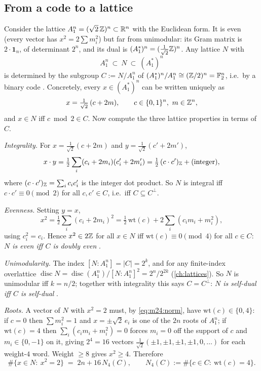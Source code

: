 \subsection*{From a code to a lattice}
Consider the lattice $A_1^n=(\sqrt2\,\mathbb{Z})^n\subset\mathbb{R}^n$ with the Euclidean form. It is even
(every vector has $x^2=2\sum m_i^2$) but far from unimodular: its Gram matrix is $2\cdot\mathbf1_n$,
of determinant $2^n$, and its dual is $(A_1^*)^n=(\tfrac1{\sqrt2}\mathbb{Z})^n$. Any lattice $N$ with
\begin{equation}\label{eq:m24:sandwich}
 A_1^n\ \subset\ N\ \subset\ (A_1^*)^n
\end{equation}
is determined by the subgroup $C:=N/A_1^n$ of $(A_1^*)^n/A_1^n\cong(\mathbb{Z}/2)^n=\mathbb F_2^n$,
i.e.\ by a binary code . Concretely, every
$x\in(A_1^*)^n$ can be written uniquely as
\begin{equation}\label{eq:m24:xcm}
 x=\tfrac1{\sqrt2}\,(c+2m),\qquad c\in\{0,1\}^n,\ m\in\mathbb{Z}^n ,
\end{equation}
and $x\in N$ iff $c\bmod2\in C$. Now compute the three lattice properties in terms of $C$.

\emph{Integrality.} For $x=\tfrac1{\sqrt2}(c+2m)$ and $y=\tfrac1{\sqrt2}(c'+2m')$,
\begin{equation}\label{eq:m24:pairing}
 x\cdot y=\tfrac12\sum_i(c_i+2m_i)(c'_i+2m'_i)=\tfrac12\,(c\cdot c')_{\mathbb{Z}}+\text{(integer)},
\end{equation}
where $(c\cdot c')_{\mathbb{Z}}=\sum_ic_ic'_i$ is the integer dot product. So $N$ is integral iff
$c\cdot c'\equiv0\pmod2$ for all $c,c'\in C$, i.e.\ iff $C\subseteq C^\perp$.

\emph{Evenness.} Setting $y=x$,
\begin{equation}\label{eq:m24:norm}
 x^2=\tfrac12\sum_i(c_i+2m_i)^2=\tfrac12\,\mathrm{wt}(c)+2\sum_i(c_im_i+m_i^2),
\end{equation}
using $c_i^2=c_i$. Hence $x^2\in2\mathbb{Z}$ for all $x\in N$ iff $\mathrm{wt}(c)\equiv0\pmod4$ for
all $c\in C$: \emph{$N$ is even iff $C$ is doubly even} .

\emph{Unimodularity.} The index $[N:A_1^n]=|C|=2^k$, and for any finite-index overlattice
$\operatorname{disc}N=\operatorname{disc}(A_1^n)/[N:A_1^n]^2=2^n/2^{2k}$ (\cref{ch:lattices}).
So $N$ is unimodular iff $k=n/2$; together with integrality this says $C=C^\perp$:
\emph{$N$ is self-dual iff $C$ is self-dual} .

\emph{Roots.} A vector of $N$ with $x^2=2$ must, by \eqref{eq:m24:norm}, have
$\mathrm{wt}(c)\in\{0,4\}$: if $c=0$ then $\sum m_i^2=1$ and $x=\pm\sqrt2\,e_i$ is one of the
$2n$ roots of $A_1^n$; if $\mathrm{wt}(c)=4$ then $\sum_i(c_im_i+m_i^2)=0$ forces $m_i=0$ off
the support of $c$ and $m_i\in\{0,-1\}$ on it, giving $2^4=16$ vectors
$\tfrac1{\sqrt2}(\pm1,\pm1,\pm1,\pm1,0,\dots)$ for each weight-$4$ word. Weight $\ge8$ gives
$x^2\ge4$. Therefore
\begin{equation}\label{eq:m24:roots}
 \#\{x\in N:\ x^2=2\}\;=\;2n+16\,N_4(C),\qquad N_4(C):=\#\{c\in C:\ \mathrm{wt}(c)=4\}.
\end{equation}

